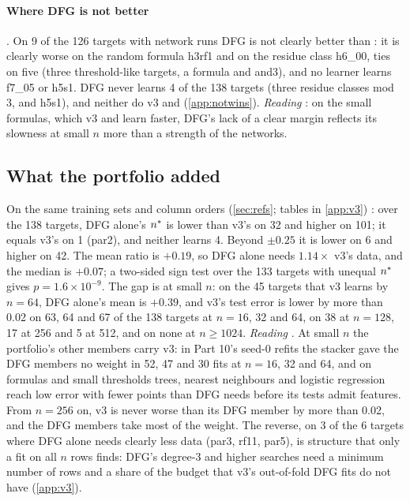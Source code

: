\paragraph{Where DFG is not better} . On 9 of the 126 targets with network runs DFG is not clearly better than : it is clearly worse on the random formula h3rf1 and on the residue class h6\_00, ties on five (three threshold-like targets, a formula and and3), and no learner learns f7\_05 or h5s1. DFG never learns 4 of the 138 targets (three residue classes mod 3, and h5s1), and neither do v3 and  (\cref{app:notwins}). \emph{Reading} : on the small formulas, which v3 and  learn faster, DFG's lack of a clear margin reflects its slowness at small $n$ more than a strength of the networks.

\subsection{What the portfolio added}\label{sec:res-v3}

On the same training sets and column orders (\cref{sec:refs}; tables in \cref{app:v3}) : over the 138 targets, DFG alone's $n^{*}$ is lower than v3's on 32 and higher on 101; it equals v3's on 1 (par2), and neither learns 4. Beyond $\pm0.25$ it is lower on 6 and higher on 42. The mean ratio is $+0.19$, so DFG alone needs $1.14\times$ v3's data, and the median is $+0.07$; a two-sided sign test over the 133 targets with unequal $n^{*}$ gives $p=1.6\times10^{-9}$. The gap is at small $n$: on the 45 targets that v3 learns by $n=64$, DFG alone's mean is $+0.39$, and v3's test error is lower by more than 0.02 on 63, 64 and 67 of the 138 targets at $n=16$, 32 and 64, on 38 at $n=128$, 17 at 256 and 5 at 512, and on none at $n\ge1024$.
\emph{Reading} . At small $n$ the portfolio's other members carry v3: in Part 10's seed-0 refits the stacker gave the DFG members no weight in 52, 47 and 30 fits at $n=16$, 32 and 64, and on formulas and small thresholds trees, nearest neighbours and logistic regression reach low error with fewer points than DFG needs before its tests admit features. From $n=256$ on, v3 is never worse than its DFG member by more than 0.02, and the DFG members take most of the weight. The reverse, on 3 of the 6 targets where DFG alone needs clearly less data (par3, rf11, par5), is structure that only a fit on all $n$ rows finds: DFG's degree-3 and higher searches need a minimum number of rows and a share of the budget that v3's out-of-fold DFG fits do not have (\cref{app:v3}).


